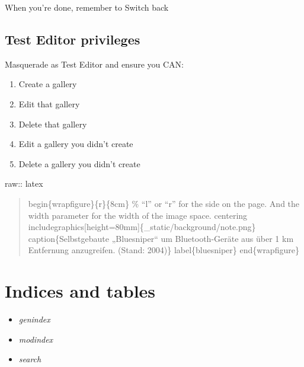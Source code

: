 \documentclass[letterpaper,10pt,english]{sphinxmanual}
\begin{document}
When you’re done, remember to Switch back


\section{Test Editor privileges}
\label{slideshows:test-editor-privileges}
Masquerade as Test Editor and ensure you CAN:
\begin{enumerate}
\item {} 
Create a gallery

\item {} 
Edit that gallery

\item {} 
Delete that gallery

\item {} 
Edit a gallery you didn’t create

\item {} 
Delete a gallery you didn’t create

\end{enumerate}

raw:: latex
\begin{quote}

begin\{wrapfigure\}\{r\}\{8cm\}  \% ``l'' or ``r'' for the side on the page. And the width parameter for the width of the image space.
centering
includegraphics{[}height=80mm{]}\{\_static/background/note.png\}
caption\{Selbstgebaute „Bluesniper“ um Bluetooth-Geräte aus über 1 km Entfernung anzugreifen. (Stand: 2004)\}
label\{bluesniper\}
end\{wrapfigure\}
\end{quote}


\chapter{Indices and tables}
\label{index:indices-and-tables}\label{index::doc}\begin{itemize}
\item {} 
\emph{genindex}

\item {} 
\emph{modindex}

\item {} 
\emph{search}

\end{itemize}



\renewcommand{\indexname}{Index}
\printindex
\end{document}
